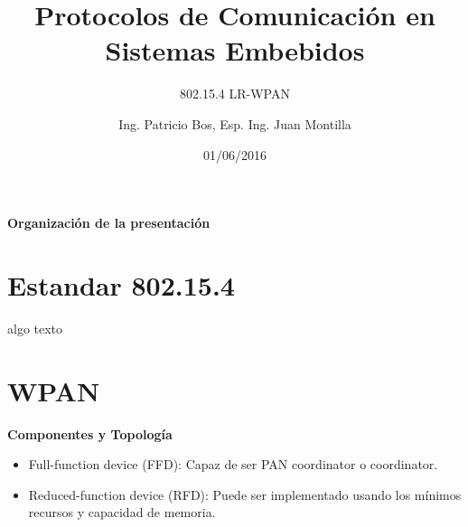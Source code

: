 \documentclass[aspectratio=169]{beamer}
\title[802.15.4 LR-WPAN]{Protocolos de Comunicación en Sistemas Embebidos}
\subtitle{802.15.4 LR-WPAN}
\author[]{Ing. Patricio Bos, Esp. Ing. Juan Montilla}
\institute[LSE-FIUBA]{Laboratorio de Sistemas Embebidos - FIUBA}
\date{01/06/2016}
\begin{document}
\begingroup
\makeatletter
\setlength{\hoffset}{-.5\beamer@sidebarwidth}
\makeatother
\begin{frame}
  \titlepage
\end{frame}

\endgroup



\begin{frame}{\textbf{Organización de la presentación}}
  \tableofcontents
\end{frame}
%
%
%
\section{Estandar 802.15.4}

\begin{frame}{algo}
texto
\end{frame}


\section{WPAN}

\begin{frame}{\textbf{Componentes y Topología}}
\begin{minipage}[c]{1.0\linewidth}

	\begin{minipage}[c]{0.6\linewidth}
		\begin{itemize}
			\item Full-function device (FFD): Capaz de ser PAN coordinator o coordinator. 
			\vspace{10px}
			\item Reduced-function device (RFD): Puede ser implementado usando los mínimos recursos y capacidad de memoria.
			\vspace{10px}
	  	\end{itemize}	
	\end{minipage}

	\begin{minipage}[c]{0.35\linewidth}
		\begin{figure}[H]
		\end{figure}	  	  	
	\end{minipage}

\end{minipage}
\end{frame}
\end{document}
